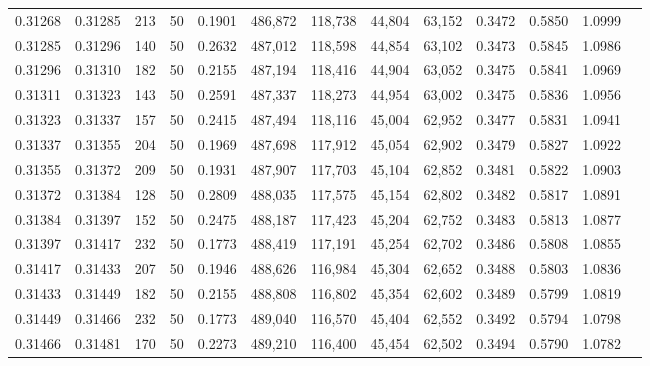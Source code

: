 \begin{tabular}{rrrrrrrrrrrrr}
0.31268 & 0.31285 &   213 &  50 &                                     0.1901 & 486,872 & 118,738 &  44,804 &  63,152 & 0.3472 & 0.5850 & 1.0999 \\
0.31285 & 0.31296 &   140 &  50 &                                     0.2632 & 487,012 & 118,598 &  44,854 &  63,102 & 0.3473 & 0.5845 & 1.0986 \\
0.31296 & 0.31310 &   182 &  50 &                                     0.2155 & 487,194 & 118,416 &  44,904 &  63,052 & 0.3475 & 0.5841 & 1.0969 \\
0.31311 & 0.31323 &   143 &  50 &                                     0.2591 & 487,337 & 118,273 &  44,954 &  63,002 & 0.3475 & 0.5836 & 1.0956 \\
0.31323 & 0.31337 &   157 &  50 &                                     0.2415 & 487,494 & 118,116 &  45,004 &  62,952 & 0.3477 & 0.5831 & 1.0941 \\
0.31337 & 0.31355 &   204 &  50 &                                     0.1969 & 487,698 & 117,912 &  45,054 &  62,902 & 0.3479 & 0.5827 & 1.0922 \\
0.31355 & 0.31372 &   209 &  50 &                                     0.1931 & 487,907 & 117,703 &  45,104 &  62,852 & 0.3481 & 0.5822 & 1.0903 \\
0.31372 & 0.31384 &   128 &  50 &                                     0.2809 & 488,035 & 117,575 &  45,154 &  62,802 & 0.3482 & 0.5817 & 1.0891 \\
0.31384 & 0.31397 &   152 &  50 &                                     0.2475 & 488,187 & 117,423 &  45,204 &  62,752 & 0.3483 & 0.5813 & 1.0877 \\
0.31397 & 0.31417 &   232 &  50 &                                     0.1773 & 488,419 & 117,191 &  45,254 &  62,702 & 0.3486 & 0.5808 & 1.0855 \\
0.31417 & 0.31433 &   207 &  50 &                                     0.1946 & 488,626 & 116,984 &  45,304 &  62,652 & 0.3488 & 0.5803 & 1.0836 \\
0.31433 & 0.31449 &   182 &  50 &                                     0.2155 & 488,808 & 116,802 &  45,354 &  62,602 & 0.3489 & 0.5799 & 1.0819 \\
0.31449 & 0.31466 &   232 &  50 &                                     0.1773 & 489,040 & 116,570 &  45,404 &  62,552 & 0.3492 & 0.5794 & 1.0798 \\
0.31466 & 0.31481 &   170 &  50 &                                     0.2273 & 489,210 & 116,400 &  45,454 &  62,502 & 0.3494 & 0.5790 & 1.0782 \\

\end{tabular}
